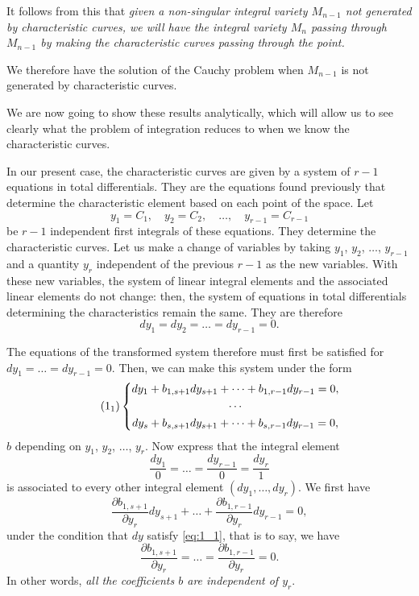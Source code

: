 \documentclass[leqno,11pt]{book}
\newcommand{\pd}{\partial}
\theoremstyle{shape1}
\theoremstyle{shapesmall}
\newcommand{\somespace}{\vspace{9pt}}
\begin{document}
\somespace

It follows from this that \emph{given a non-singular integral variety $M_{n-1}$ not generated by characteristic curves, we will have the integral variety $M_{n}$ passing through $M_{n-1}$ by making the characteristic curves passing through the point.}

We therefore have the solution of the Cauchy problem when $M_{n-1}$ is not generated by characteristic curves.

We are now going to show these results analytically, which will allow us to see clearly what the problem of integration reduces to when we know the characteristic curves.

In our present case, the characteristic curves are given by a system of $r-1$ equations in total differentials. They are the equations found previously that determine the characteristic element based on each point of the space. Let
\[
y_{1}=C_{1},\quad y_{2}=C_{2},\quad \dots,\quad y_{r-1}=C_{r-1}
\]
be $r-1$ independent first integrals of these equations. They determine the characteristic curves. Let us make a change of variables by taking $y_{1}$, $y_{2}$, $\dots$, $y_{r-1}$ and a quantity $y_{r}$ independent of the previous $r-1$ as the new variables. With these new variables, the system of linear integral elements and the associated linear elements do not change: then, the system of equations in total differentials determining the characteristics remain the same. They are therefore
\[
dy_{1}=dy_{2}=\dots=dy_{r-1}=0.
\]

The equations of the transformed system therefore must first be satisfied for $dy_{1}=\dots=dy_{r-1}=0$. Then, we can make this system under the form
\begin{equation}
  \label{eq:1_1}\tag{$1_{1}$}
  \left\{
    \begin{gathered}
      dy_{1}+b_{1,s+1}dy_{s+1}+\dots+b_{1,r-1}dy_{r-1}=0,\\
      \cdots\\
      dy_{s}+b_{s,s+1}dy_{s+1}+\dots+b_{s,r-1}dy_{r-1}=0,
    \end{gathered}
  \right.
\end{equation}
$b$ depending on $y_{1}$, $y_{2}$, $\dots$, $y_{r}$. Now express that the integral element
\[
\frac{dy_{1}}{0}=\dots=\frac{dy_{r-1}}{0}=\frac{dy_{r}}{1}
\]
is associated to every other integral element $(dy_{1},\dots,dy_{r})$. We first have
\[
\frac{\pd b_{1,s+1}}{\pd y_{r}}dy_{s+1}+\dots+\frac{\pd b_{1,r-1}}{\pd y_{r}}{dy_{r-1}}=0,
\]
under the condition that $dy$ satisfy \eqref{eq:1_1}, that is to say, we have
\[
\frac{\pd b_{1,s+1}}{\pd y_{r}}=\dots=\frac{\pd b_{1,r-1}}{\pd y_{r}}=0.
\]
In other words, \emph{all the coefficients $b$ are independent of $y_{r}$}.
\end{document}
